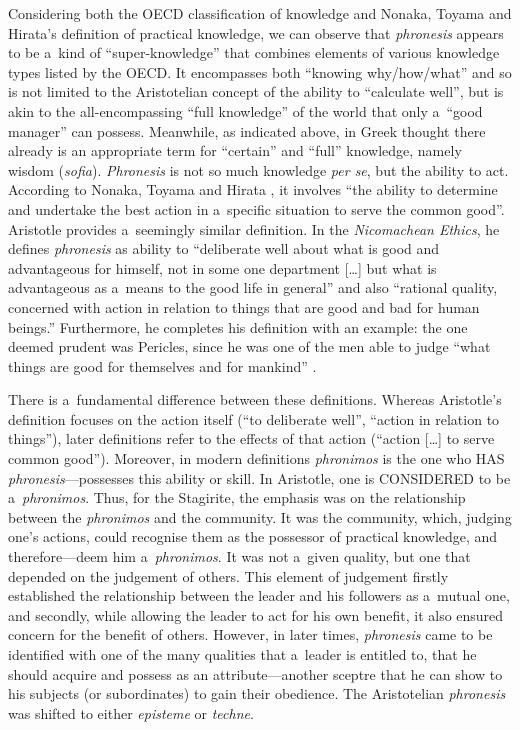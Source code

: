 Considering both the OECD classification of knowledge and Nonaka, Toyama and Hirata's definition of practical knowledge, we can observe that \textit{phronesis} appears to be a~kind of ``super-knowledge'' that combines elements of various knowledge types listed by the OECD. It encompasses both ``knowing why/how/what'' and so is not limited to the Aristotelian concept of the ability to ``calculate well'', but is akin to the all-encompassing ``full knowledge'' of the world that only a~``good manager'' can possess. Meanwhile, as indicated above, in Greek thought there already is an appropriate term for ``certain'' and ``full'' knowledge, namely wisdom (\textit{sofia}). \textit{Phronesis} is not so much knowledge \textit{per se}, but the ability to act. According to Nonaka, Toyama and Hirata 
\parencite*[][p.53]{}, %
 it involves ``the ability to determine and undertake the best action in a~specific situation to serve the common good''. Aristotle provides a~seemingly similar definition. In the \textit{Nicomachean Ethics}, he defines \textit{phronesis} as ability to ``deliberate well about what is good and advantageous for himself, not in some one department […] but what is advantageous as a~means to the good life in general'' and also ``rational quality, concerned with action in relation to things that are good and bad for human beings.'' Furthermore, he completes his definition with an example: the one deemed prudent was Pericles, since he was one of the men able to judge ``what things are good for themselves and for mankind'' 
\parencite[][]{rackham_nicomachean_1934}.%




There is a~fundamental difference between these definitions. Whereas Aristotle's definition focuses on the action itself (``to deliberate well'', ``action in relation to things''), later definitions refer to the effects of that action (``action […] to serve common good''). Moreover, in modern definitions \textit{phronimos} is the one who HAS \textit{phronesis}---possesses this ability or skill. In Aristotle, one is CONSIDERED to be a~\textit{phronimos}. Thus, for the Stagirite, the emphasis was on the relationship between the \textit{phronimos} and the community. It was the community, which, judging one's actions, could recognise them as the possessor of practical knowledge, and therefore---deem him a~\textit{phronimos}. It was not a~given quality, but one that depended on the judgement of others. This element of judgement firstly established the relationship between the leader and his followers as a~mutual one, and secondly, while allowing the leader to act for his own benefit, it also ensured concern for the benefit of others. However, in later times, \textit{phronesis} came to be identified with one of the many qualities that a~leader is entitled to, that he should acquire and possess as an attribute---another sceptre that he can show to his subjects (or subordinates) to gain their obedience. The Aristotelian \textit{phronesis} was shifted to either \textit{episteme} or \textit{techne}.



